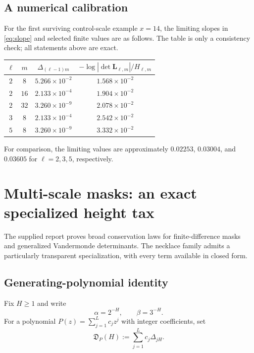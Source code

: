 \documentclass[11pt]{article}
\numberwithin{equation}{section}
\theoremstyle{definition}
\theoremstyle{remark}
\begin{document}
\subsection{A numerical calibration}

For the first surviving control-scale example $x=14$, the limiting slopes in \eqref{eq:slope} and selected finite values are as follows.  The table is only a consistency check; all statements above are exact.

\begin{center}
\begin{tabular}{c c c c}
\toprule
$\ell$ & $m$ & $\Delta_{(\ell-1)m}$ &
$-\log|\det\mathbf L_{\ell,m}|/H_{\ell,m}$\\
\midrule
$2$ & $8$  & $5.266\times10^{-2}$ & $1.568\times10^{-2}$\\
$2$ & $16$ & $2.133\times10^{-4}$ & $1.904\times10^{-2}$\\
$2$ & $32$ & $3.260\times10^{-9}$ & $2.078\times10^{-2}$\\
$3$ & $8$  & $2.133\times10^{-4}$ & $2.542\times10^{-2}$\\
$5$ & $8$  & $3.260\times10^{-9}$ & $3.332\times10^{-2}$\\
\bottomrule
\end{tabular}
\end{center}
For comparison, the limiting values are approximately $0.02253$, $0.03004$, and $0.03605$ for $\ell=2,3,5$, respectively.

\section{Multi-scale masks: an exact specialized height tax}

The supplied report proves broad conservation laws for finite-difference masks and generalized Vandermonde determinants.  The necklace family admits a particularly transparent specialization, with every term available in closed form.

\subsection{Generating-polynomial identity}

Fix $H\ge1$ and write
\begin{equation}\label{eq:maskalphabeta}
  \alpha=2^{-H},\qquad \beta=3^{-H}.
\end{equation}
For a polynomial $P(z)=\sum_{j=1}^L c_jz^j$ with integer coefficients, set
\begin{equation}\label{eq:maskedD}
  \mathfrak D_P(H):=\sum_{j=1}^L c_j\Delta_{jH}.
\end{equation}
\end{document}
